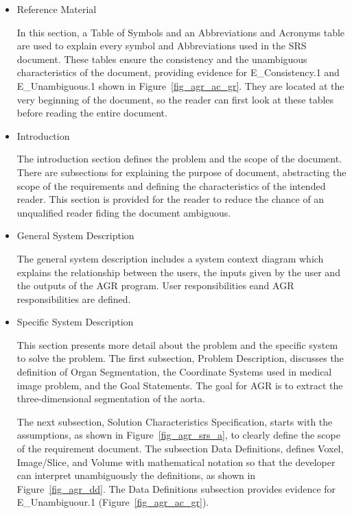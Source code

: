 \begin{itemize}
\item Reference Material

In this section, a Table of Symbols and an Abbreviations and Acronyms table are used to explain every symbol and Abbreviations used in the SRS document. These tables ensure the consistency and the unambiguous characteristics of the document, providing evidence for E\_Consistency.1 and E\_Unambiguous.1 shown in Figure~\ref{fig_agr_ac_gr}. They are located at the very beginning of the document, so the reader can first look at these tables before reading the entire document. 

\item Introduction

The introduction section defines the problem and the scope of the document.  There are subsections for explaining the purpose of document, abstracting the scope of the requirements and defining the characteristics of the intended reader. This section is provided for the reader to reduce the chance of an unqualified reader fiding the document ambiguous.

\item General System Description

The general system description includes a system context diagram which explains the relationship between the users, the inputs given by the user and the outputs of the AGR program. User responsibilities eand AGR responsibilities are defined.

\item Specific System Description

This section presents more detail about the problem and the specific system to solve the problem. The first subsection, Problem Description, discusses the definition of Organ Segmentation, the Coordinate Systems used in medical image problem, and the Goal Statements. The goal for AGR is to extract the three-dimensional segmentation of the aorta.

\hspace{\enumerateparindent}The next subsection, Solution Characteristics Specification, starts with the assumptions, as shown in Figure~\ref{fig_agr_srs_a},  to clearly define the scope of the requirement document. The subsection Data Definitions, defines Voxel, Image/Slice, and Volume with mathematical notation so that the developer can interpret unambiguously the definitions, as shown in Figure~\ref{fig_agr_dd}.  The Data Definitions subsection provides evidence for E\_Unambiguour.1 (Figure~\ref{fig_agr_ac_gr}).


\end{itemize}
